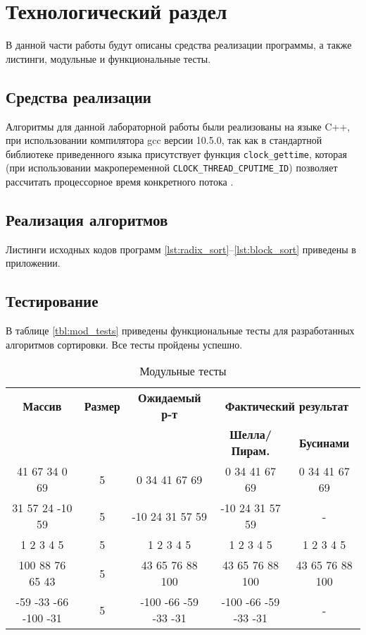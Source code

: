 \chapter{Технологический раздел}

В данной части работы будут описаны средства реализации программы, а также листинги, модульные и функциональные тесты.

\section{Средства реализации}
Алгоритмы для данной лабораторной работы были реализованы на языке C++, при использовании компилятора gcc версии 10.5.0, так как в стандартной библиотеке приведенного языка
присутствует функция \texttt{clock\_gettime}, которая (при использовании макропеременной \texttt{CLOCK\_THREAD\_CPUTIME\_ID}) позволяет рассчитать процессорное время конкретного потока \cite{cpp-time}.



\section{Реализация алгоритмов}
Листинги исходных кодов программ  \ref{lst:radix_sort}--\ref{lst:block_sort} приведены в приложении.


\section{Тестирование}

В таблице \ref{tbl:mod_tests} приведены функциональные тесты для разработанных алгоритмов сортировки. Все тесты пройдены успешно.
\begin{table}[ht]
	\small
	\begin{center}
		\begin{threeparttable}
			\caption{Модульные тесты}
			\label{t:mod_tests}
			\begin{tabular}{|c|c|c|c|c|}
				\hline
				\bfseries Массив
				& \bfseries Размер
				& \bfseries Ожидаемый р-т
				& \multicolumn{2}{c|}{\bfseries Фактический результат} \\ \cline{4-5}
				& & & \bfseries Шелла/Пирам. & \bfseries Бусинами \\
				\hline
				41 67 34 0 69 & 5 & 0 34 41 67 69 & 0 34 41 67 69 & 0 34 41 67 69 \\
				\hline
				31 57 24 -10 59 & 5 & -10 24 31 57 59 & -10 24 31 57 59 & - \\
				\hline
				1 2 3 4 5 & 5 & 1 2 3 4 5 & 1 2 3 4 5 & 1 2 3 4 5 \\
				\hline
				100 88 76 65 43 & 5 & 43 65 76 88 100 & 43 65 76 88 100 & 43 65 76 88 100 \\
				\hline
				-59 -33 -66 -100 -31 & 5 & -100 -66 -59 -33 -31 & -100 -66 -59 -33 -31 & - \\
				\hline
			\end{tabular}	
		\end{threeparttable}	
	\end{center}
\end{table}